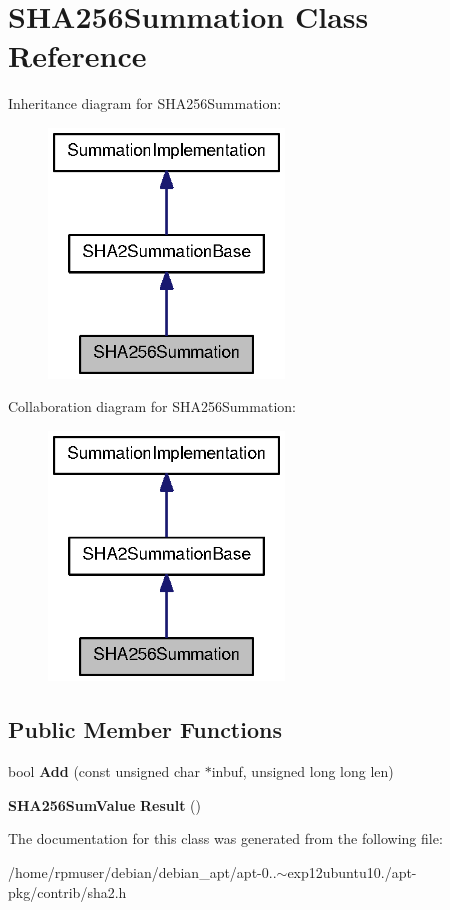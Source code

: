 \section{\-S\-H\-A256\-Summation \-Class \-Reference}
\label{classSHA256Summation}


\-Inheritance diagram for \-S\-H\-A256\-Summation\-:
\nopagebreak
\begin{figure}[H]
\begin{center}
\leavevmode
\includegraphics[width=178pt]{classSHA256Summation__inherit__graph}
\end{center}
\end{figure}


\-Collaboration diagram for \-S\-H\-A256\-Summation\-:
\nopagebreak
\begin{figure}[H]
\begin{center}
\leavevmode
\includegraphics[width=178pt]{classSHA256Summation__coll__graph}
\end{center}
\end{figure}
\subsection*{\-Public \-Member \-Functions}
\begin{DoxyCompactItemize}
\item 
bool {\bfseries \-Add} (const unsigned char $\ast$inbuf, unsigned long long len)\label{classSHA256Summation_aaf9245e21054d9eba3299d4cfd61e0e4}

\item 
{\bf \-S\-H\-A256\-Sum\-Value} {\bfseries \-Result} ()\label{classSHA256Summation_aba56b3ad026bcd63c44cbacfbe10051c}

\end{DoxyCompactItemize}


\-The documentation for this class was generated from the following file\-:\begin{DoxyCompactItemize}
\item 
/home/rpmuser/debian/debian\-\_\-apt/apt-\/0..$\sim$exp12ubuntu10./apt-\/pkg/contrib/sha2.\-h\end{DoxyCompactItemize}
